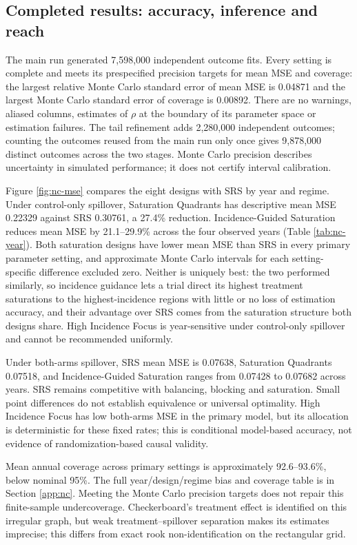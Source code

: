 \documentclass[11pt]{article}
\begin{document}
\subsection{Completed results: accuracy, inference and
reach}\label{completed-results-accuracy-inference-and-reach}

The main run generated 7,598,000 independent outcome fits. Every setting is complete and meets its prespecified precision targets for mean MSE and coverage: the largest relative Monte Carlo standard error of mean MSE is 0.04871 and the largest Monte Carlo standard error of coverage is 0.00892. There are no warnings, aliased columns, estimates of $\rho$ at the boundary of its parameter space or estimation failures. The tail refinement adds 2,280,000 independent outcomes; counting the outcomes reused from the main run only once gives 9,878,000 distinct outcomes across the two stages. Monte Carlo precision describes
uncertainty in simulated performance; it does not certify interval
calibration.

Figure \ref{fig:nc-mse} compares the eight designs with SRS by year and regime.
Under control-only spillover, Saturation Quadrants has descriptive mean MSE
0.22329 against SRS 0.30761, a 27.4\% reduction. Incidence-Guided Saturation
reduces mean MSE by 21.1--29.9\% across the four observed years (Table
\ref{tab:nc-year}). Both saturation designs have lower mean MSE than SRS in every primary parameter setting, and approximate Monte Carlo intervals for each setting-specific difference excluded zero. Neither is uniquely best: the two performed similarly, so incidence guidance lets a trial direct its highest treatment saturations to the highest-incidence regions with little or no loss of estimation accuracy, and their advantage over SRS comes from the saturation structure both designs share. High Incidence Focus is year-sensitive
under control-only spillover and cannot be recommended uniformly.

Under both-arms spillover, SRS mean MSE is 0.07638, Saturation Quadrants
0.07518, and Incidence-Guided Saturation ranges from 0.07428 to 0.07682 across
years. SRS remains competitive with balancing, blocking and saturation.
Small point differences do not establish equivalence or universal
optimality. High Incidence Focus has low both-arms MSE in the primary
model, but its allocation is deterministic for these fixed rates; this
is conditional model-based accuracy, not evidence of randomization-based
causal validity.

Mean annual coverage across primary settings is approximately
92.6--93.6\%, below nominal 95\%. The full year/design/regime bias and
coverage table is in Section \ref{app:nc}. Meeting the Monte Carlo precision targets does not repair this finite-sample undercoverage. Checkerboard's
treatment effect is identified on this irregular graph, but weak
treatment--spillover separation makes its estimates imprecise; this
differs from exact rook non-identification on the rectangular grid.
\end{document}
